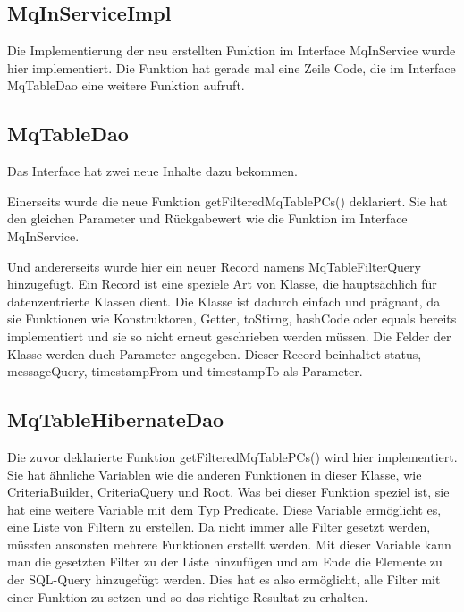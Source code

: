 \subsection{MqInServiceImpl}
Die Implementierung der neu erstellten Funktion im Interface MqInService wurde hier implementiert. Die Funktion hat gerade mal eine Zeile Code, die im Interface MqTableDao eine weitere Funktion aufruft.

\subsection{MqTableDao}
Das Interface hat zwei neue Inhalte dazu bekommen.

Einerseits wurde die neue Funktion getFilteredMqTablePCs() deklariert. Sie hat den gleichen Parameter und Rückgabewert wie die Funktion im Interface MqInService.

Und andererseits wurde hier ein neuer Record namens MqTableFilterQuery hinzugefügt. Ein Record ist eine speziele Art von Klasse, die hauptsächlich für datenzentrierte Klassen dient. Die Klasse ist dadurch einfach und prägnant, da sie Funktionen wie Konstruktoren, Getter, toStirng, hashCode oder equals bereits implementiert und sie so nicht erneut geschrieben werden müssen. Die Felder der Klasse werden duch Parameter angegeben. Dieser Record beinhaltet status, messageQuery, timestampFrom und timestampTo als Parameter.

\subsection{MqTableHibernateDao}
Die zuvor deklarierte Funktion getFilteredMqTablePCs() wird hier implementiert. Sie hat ähnliche Variablen wie die anderen Funktionen in dieser Klasse, wie CriteriaBuilder, CriteriaQuery und Root. Was bei dieser Funktion speziel ist, sie hat eine weitere Variable mit dem Typ Predicate. Diese Variable ermöglicht es, eine Liste von Filtern zu erstellen. Da nicht immer alle Filter gesetzt werden, müssten ansonsten mehrere Funktionen erstellt werden. Mit dieser Variable kann man die gesetzten Filter zu der Liste hinzufügen und am Ende die Elemente zu der SQL-Query hinzugefügt werden. Dies hat es also ermöglicht, alle Filter mit einer Funktion zu setzen und so das richtige Resultat zu erhalten.

